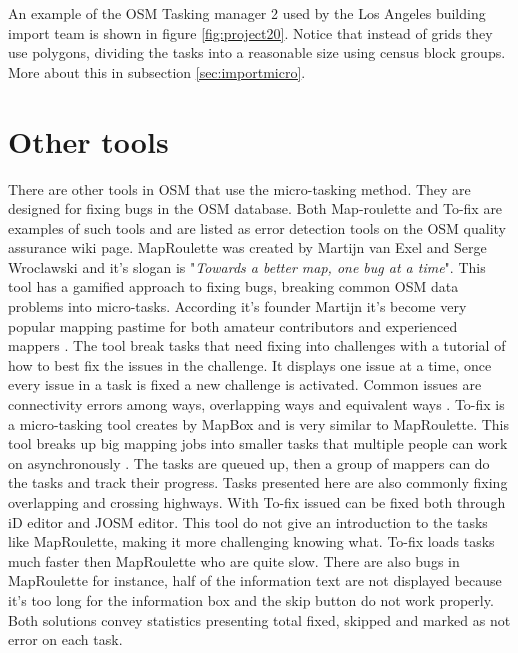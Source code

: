 An example of the OSM Tasking manager 2 used by the Los Angeles building import team is shown in figure \ref{fig:project20}. Notice that instead of grids they use polygons, dividing the tasks into a reasonable size using census block groups. More about this in subsection \ref{sec:importmicro}. 

\section{Other tools}
There are other tools in OSM that use the micro-tasking method. They are designed for fixing bugs in the OSM database. Both Map-roulette and To-fix are examples of such tools and are listed as error detection tools on the OSM quality assurance wiki page. MapRoulette was created by Martijn van Exel and Serge Wroclawski and it's slogan is "\textit{Towards a better map, one bug at a time}". This tool has a gamified approach to fixing bugs, breaking common OSM data problems into micro-tasks. According it's founder Martijn it's become very popular mapping pastime for both amateur contributors and experienced mappers \cite{Exelvan2013}.  The tool break tasks that need fixing into challenges with a tutorial of how to best fix the issues in the challenge. It displays one issue at a time, once every issue in a task is fixed a new challenge is activated. Common issues are connectivity errors among ways, overlapping ways and equivalent ways \cite{OpenStreetMapk}. To-fix is a micro-tasking tool creates by MapBox and is very similar to MapRoulette. This tool breaks up big mapping jobs into smaller tasks that multiple people can work on asynchronously \cite{Lidman2014}. The tasks are queued up, then a group of mappers can do the tasks and track their progress. Tasks presented here are also commonly fixing overlapping and crossing highways. With To-fix issued can be fixed both through iD editor and JOSM editor. This tool do not give an introduction to the tasks like MapRoulette, making it more challenging knowing what. To-fix loads tasks much faster then MapRoulette who are quite slow. There are also bugs in MapRoulette for instance, half of the information text are not displayed because it's too long for the information box and the skip button do not work properly. Both solutions convey statistics presenting total fixed, skipped and marked as not error on each task. 

